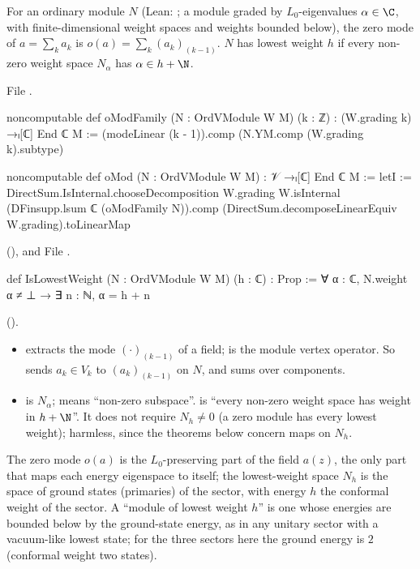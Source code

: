 \begin{definition}\label{ch12:def:omod}
For an ordinary module $N$ (Lean: ; a module graded by $L_0$-eigenvalues
$\alpha\in\C$, with finite-dimensional weight spaces and weights bounded below), the zero mode of
$a=\sum_ka_k$ is $o(a)=\sum_k(a_k)_{(k-1)}$.  $N$ has lowest weight $h$ if every non-zero weight space
$N_\alpha$ has $\alpha\in h+\N$.
\end{definition}
File .
\begin{leancode}
noncomputable def oModFamily (N : OrdVModule W M) (k : ℤ) : (W.grading k) →ₗ[ℂ] End ℂ M :=
  (modeLinear (k - 1)).comp (N.YM.comp (W.grading k).subtype)

noncomputable def oMod (N : OrdVModule W M) : 𝒱 →ₗ[ℂ] End ℂ M :=
  letI := DirectSum.IsInternal.chooseDecomposition W.grading W.isInternal
  (DFinsupp.lsum ℂ (oModFamily N)).comp (DirectSum.decomposeLinearEquiv W.grading).toLinearMap
\end{leancode}
(), and
File .
\begin{leancode}
def IsLowestWeight (N : OrdVModule W M) (h : ℂ) : Prop :=
  ∀ α : ℂ, N.weight α ≠ ⊥ → ∃ n : ℕ, α = h + n
\end{leancode}
().
\begin{dictionary}
\begin{itemize}
\item {} extracts the mode $(\cdot)_{(k-1)}$ of a field;  is the module
  vertex operator.  So  sends $a_k\in V_k$ to $(a_k)_{(k-1)}$ on $N$, and
   sums over components.
\item {} is $N_\alpha$;  means ``non-zero subspace''.  
  is ``every non-zero weight space has weight in $h+\N$''.  It does not require $N_h\neq0$ (a zero
  module has every lowest weight); harmless, since the theorems below concern maps on $N_h$.
\end{itemize}
\end{dictionary}

\begin{physics}
The zero mode $o(a)$ is the $L_0$-preserving part of the field $a(z)$, the only part that maps each energy eigenspace to itself; the lowest-weight space $N_h$ is the space of ground states (primaries) of the sector, with energy $h$ the conformal weight of the sector. A ``module of lowest weight $h$'' is one whose energies are bounded below by the ground-state energy, as in any unitary sector with a vacuum-like lowest state; for the three sectors here the ground energy is $2$ (conformal weight two states).
\end{physics}

